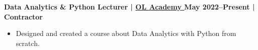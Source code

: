 \textbf{Data Analytics \& Python Lecturer | 
\href{https://olacademy.ge/user-public-account/85}{
    {OL Academy} 
} \hfill May 2022--Present | Contractor}

\begin{itemize}[label=$\bullet$]
    \item Designed and created a course about Data Analytics with Python from scratch.
\end{itemize}\par